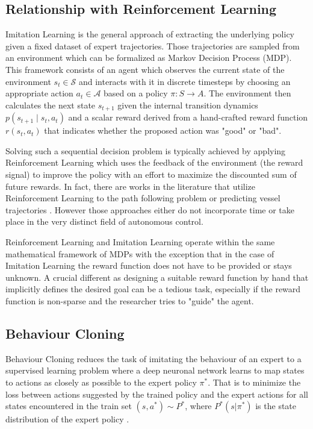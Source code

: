 \documentclass[conference]{IEEEtran}
\begin{document}
\subsection{Relationship with Reinforcement Learning}
Imitation Learning is the general approach of extracting the underlying policy given a fixed dataset of expert trajectories. Those trajectories are sampled from an environment which can be  formalized as Markov Decision Process (MDP). This framework consists of an agent which observes the current state of the environment $s_t \in \mathcal{S}$ and interacts with it in discrete timesteps by choosing an appropriate action $a_t \in \mathcal{A}$ based on a policy $\pi: S \rightarrow A$. The environment then calculates the next state $s_{t+1}$ given the internal transition dynamics $p(s_{t+1} \mid s_t, a_t)$  and a scalar reward derived from a hand-crafted reward function $r(s_t, a_t)$ that indicates whether the proposed action was "good" or "bad".
\par
Solving such a sequential decision problem is typically achieved by applying Reinforcement Learning which uses the feedback of the environment (the reward signal) to improve the policy with an effort to maximize the discounted sum of future rewards. In fact, there are works in the literature that utilize Reinforcement Learning to the path following problem \cite{martinsen2018curved} or predicting vessel trajectories \cite{etemad2020using, zare2021continuous, s20020426, westerlund2021learning}. However those approaches either do not incorporate time or take place in the very distinct field of autonomous control. 
\par
Reinforcement Learning and Imitation Learning operate within the same mathematical framework of MDPs with the exception that in the case of Imitation Learning the reward function does not have to be provided or stays unknown. A crucial different as designing a suitable reward function by hand that implicitly defines the desired goal can be a tedious task, especially if the reward function is non-sparse and the researcher tries to "guide" the agent.

\subsection{Behaviour Cloning}
Behaviour Cloning\cite{alvinn} reduces the task of imitating the behaviour of an expert to a supervised learning problem where a deep neuronal network learns to map states to actions as closely as possible to the expert policy $\pi^*$. That is to minimize the loss between actions suggested by the trained policy and the expert actions for all states encountered in the train set $(s, a^*) \sim P^*$, where $P^*(s|\pi^*)$ is the state distribution of the expert policy \cite{le2022survey}.
\end{document}
